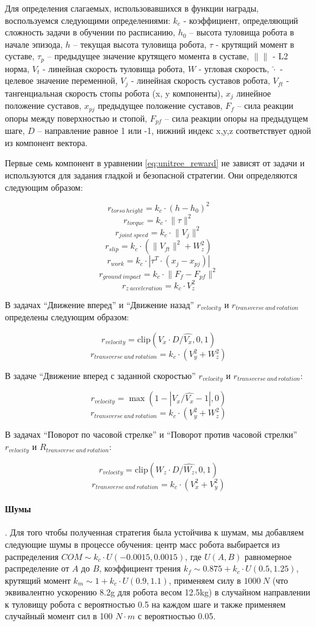 Для определения слагаемых, использовавшихся в функции награды, воспользуемся следующими определениями: 
 $k_c$ - коэффициент, определяющий сложность задачи в обучении по расписанию, $h_0$ – высота туловища робота в начале эпизода, $h$ – текущая высота туловища робота, $\tau$ - крутящий момент в суставе, $\tau_p$ – предыдущее значение крутящего момента в суставе, $\lVert \rVert$ - L2 норма, $V_t$ - линейная скорость туловища робота, $W$ - угловая скорость, $\hat{\cdot}$ - целевое значение переменной, $V_j$ - линейная скорость суставов робота, $V_{ft}$ - тангенциальная скорость стопы робота (x, y компоненты), $x_j$ линейное положение суставов, $x_{pj}$ предыдущее положение суставов, $F_f$ – сила реакции опоры между поверхностью и стопой, $F_{pf}$ – сила реакции опоры на предыдущем шаге, $D$ – направление равное 1 или -1, нижний индекс x,y,z соответствует одной из компонент вектора. 

Первые семь компонент в уравнении \ref{eq:unitree_reward} не зависят от задачи и используются для задания гладкой и безопасной стратегии. Они определяются следующим образом:

$$
r_{torso\ height}= k_c \cdot (h-h_0)^2
$$
$$
r_{torque} = k_c \cdot \lVert \tau \rVert ^2
$$
$$
r_{joint\ speed}= k_c \cdot \lVert V_j \rVert ^2
$$
$$
r_{slip} = k_c \cdot(\lVert V_{ft} \rVert ^2+ W_z^2)
$$
$$
r_{work}= k_c \cdot |\tau^T \cdot (x_j-x_{pj})|
$$
$$
r_{ground\ impact} = k_c \cdot \lVert F_f-F_{pf} \rVert ^2
$$
$$
r_{z\ acceleration}= k_c \cdot V_z^2
$$

В задачах ``Движение вперед'' и ``Движение назад'' $r_{velocity}$ и $r_{transverse\ and\ rotation}$ определены следующим образом: 

$$
r_{velocity} = \mathrm{clip}(V_x \cdot D / \hat{V_x}, 0, 1)
$$
$$
r_{transverse\ and\ rotation}= k_c \cdot (V_y^2+W_z^2)
$$

В задаче ``Движение вперед с заданной скоростью'' $r_{velocity}$ и $r_{transverse\ and\ rotation}$: 

$$
r_{velocity} = \max(1 - |V_x / \hat{V_x} - 1|, 0)
$$
$$
r_{transverse\ and\ rotation}= k_c \cdot (V_y^2+W_z^2)
$$

В задачах ``Поворот по часовой стрелке'' и ``Поворот против часовой стрелки'' $r_{velocity}$ и $R_{transverse\ and\ rotation}$: 

$$
r_{velocity} = \mathrm{clip}(W_z \cdot D / \hat{W_z}, 0, 1)
$$
$$
r_{transverse\ and\ rotation}= k_c \cdot (V_x^2+V_y^2)
$$

\paragraph{Шумы}. Для того чтобы полученная стратегия была устойчива к шумам, мы добавляем следующие шумы в процессе обучения: центр масс робота выбирается из распределения $COM \sim k_c \cdot U(-0.0015, 0.0015)$, где $U(A,B)$ равномерное распределение от $A$ до $B$, коэффициент трения $k_f \sim 0.875 + k_c \cdot U(0.5, 1.25)$, крутящий момент $k_m \sim 1 + k_c \cdot U(0.9, 1.1)$, применяем силу в $1000\ N$ (что эквивалентно  ускорению 8.2g для робота весом 12.5kg) в случайном направлении к туловищу робота с вероятностью 0.5 на каждом шаге и также применяем случайный момент сил  в 100 $N \cdot m$ с вероятностью 0.05. 

